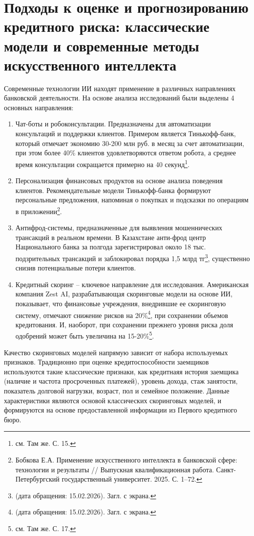 \section{Подходы к оценке и прогнозированию кредитного риска: классические модели и современные методы искусственного интеллекта}

Современные технологии ИИ находят применение в различных направлениях банковской деятельности. На основе анализа исследований были выделены 4 основных направления:
\begin{enumerate}[nosep]
	\item Чат-боты и робоконсультации. Предназначены для автоматизации консультаций и поддержки клиентов. Примером является Тинькофф-банк, который отмечает экономию 30-200 млн руб. в месяц за счет автоматизации, при этом более 40\% клиентов удовлетворяются ответом робота, а среднее время консультации сокращается примерно на 40 секунд\footnote{см. Там же. С. 15.}.
	\item Персонализация финансовых продуктов на основе анализа поведения клиентов. Рекомендательные модели Тинькофф-банка формируют персональные предложения, напоминая о покупках и подсказки по операциям в приложении\footnote{Бобкова Е.А. Применение искусственного интеллекта в банковской сфере: технологии и результаты // Выпускная квалификационная работа. Санкт-Петербургский государственный университет. 2025. С. 1--72.}.
	\item Антифрод-системы, предназначенные для выявления мошеннических трансакций в реальном времени. В Казахстане анти-фрод центр Национального банка за полгода зарегистрировал около 18 тыс. подзрительных трансакций и заблокировал порядка 1,5 млрд тг\footnote{\cite{NBRB} (дата обращения: 15.02.2026). Загл. с экрана.}, существенно снизив потенциальные потери клиентов.
	\item Кредитный скоринг -- ключевое направление для исследования. Американская компания Zest AI, разрабатывающая скоринговые модели на основе ИИ, показывает, что финансовые учреждения, внедрившие ее скоринговую систему, отмечают снижение рисков на 20\%\footnote{\cite{ZestAI} (дата обращения: 15.02.2026). Загл. с экрана.}, при сохранении объемов кредитования. И, наоборот, при сохранении прежнего уровня риска доля одобрений может быть увеличина на 15-20\%\footnote{см. Там же. С. 17.}.
\end{enumerate}

Качество скоринговых моделей напрямую зависит от набора используемых признаков. Традиционно при оценке кредитоспособности заемщиков используются такие классические признаки, как кредитнаяя история заемщика (наличие и частота просроченных платежей), уровень дохода, стаж занятости, показатель долговой нагрузки, возраст, пол и семейное положение. Данные характеристики являются основой классических скоринговых моделей, и формируются на основе предоставленной информации из Первого кредитного бюро. 

